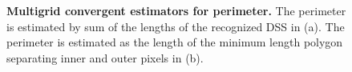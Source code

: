 \begin{figure}
\center
{}
\caption{\textbf{Multigrid convergent estimators for perimeter.} The perimeter is estimated by sum of the lengths of the recognized DSS in (a). The perimeter is estimated as the length of the minimum length polygon separating inner and outer pixels in (b).}
\end{figure}


